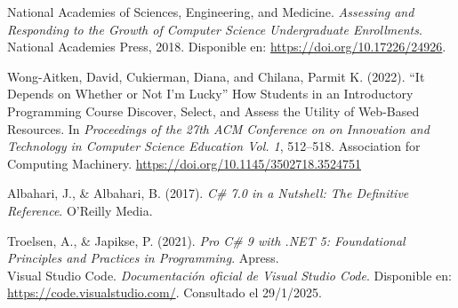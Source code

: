 \documentclass{article}
\begin{document}
\begin{thebibliography}{99}
 National Academies of Sciences, Engineering, and Medicine. \textit{Assessing and Responding to the Growth of Computer Science Undergraduate Enrollments}. National Academies Press, 2018. Disponible en: \url{https://doi.org/10.17226/24926}.

Wong-Aitken, David, Cukierman, Diana, and Chilana, Parmit K. (2022). 
``It Depends on Whether or Not I'm Lucky'' How Students in an Introductory Programming Course Discover, Select, and Assess the Utility of Web-Based Resources. 
In \textit{Proceedings of the 27th ACM Conference on on Innovation and Technology in Computer Science Education Vol. 1}, 512–518. 
Association for Computing Machinery. 
\url{https://doi.org/10.1145/3502718.3524751}

Albahari, J., \& Albahari, B. (2017). \textit{C\# 7.0 in a Nutshell: The Definitive Reference}. O'Reilly Media.

Troelsen, A., \& Japikse, P. (2021). \textit{Pro C\# 9 with .NET 5: Foundational Principles and Practices in Programming}. Apress. \\

 Visual Studio Code. \textit{Documentación oficial de Visual Studio Code}. Disponible en: \url{https://code.visualstudio.com/}. Consultado el 29/1/2025.

\end{thebibliography}
\end{document}
